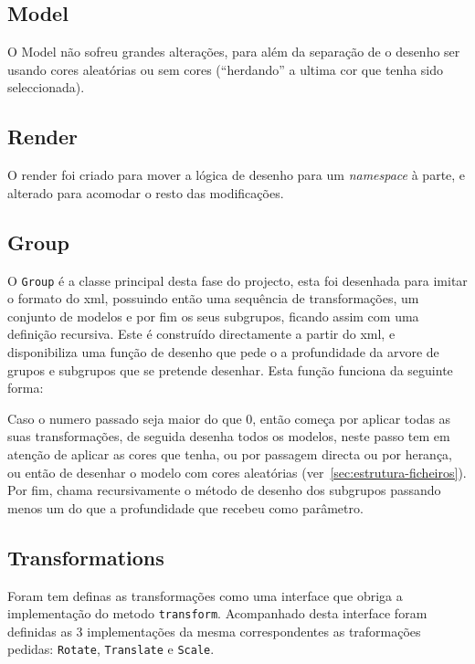 \documentclass[a4paper]{article}
\begin{document}
\subsection{Model}

O Model não sofreu grandes alterações, para além da separação de o desenho ser
usando cores aleatórias ou sem cores (``herdando'' a ultima cor que tenha sido
seleccionada).

\subsection{Render}

O render foi criado para mover a lógica de desenho para um \textit{namespace} à
parte, e alterado para acomodar o resto das modificações.

\subsection{Group}

O \texttt{Group} é a classe principal desta fase do projecto, esta foi
desenhada para imitar o formato do xml, possuindo então uma sequência de
transformações, um conjunto de modelos e por fim os seus subgrupos, ficando
assim com uma definição recursiva. Este é construído directamente a partir do
xml, e disponibiliza uma função de desenho que pede o a profundidade da arvore
de grupos e subgrupos que se pretende desenhar. Esta função funciona da
seguinte forma:

Caso o numero passado seja maior do que 0, então começa por aplicar todas as
suas transformações, de seguida desenha todos os modelos, neste passo tem em
atenção de aplicar as cores que tenha, ou por passagem directa ou por herança,
ou então de desenhar o modelo com cores aleatórias
(ver~\ref{sec:estrutura-ficheiros}). Por fim, chama recursivamente o método de
desenho dos subgrupos passando menos um do que a profundidade que recebeu como
parâmetro.

\subsection{Transformations}

Foram tem definas as transformações como uma interface que obriga a
implementação do metodo \texttt{transform}. Acompanhado desta interface foram
definidas as 3 implementações da mesma correspondentes as traformações pedidas:
\texttt{Rotate}, \texttt{Translate} e \texttt{Scale}.
\end{document}
